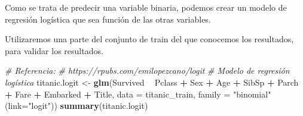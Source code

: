 \documentclass[]{article}
\newenvironment{Shaded}{\begin{snugshade}}{\end{snugshade}}
\newcommand{\KeywordTok}[1]{\textcolor[rgb]{0.13,0.29,0.53}{\textbf{#1}}}
\newcommand{\DataTypeTok}[1]{\textcolor[rgb]{0.13,0.29,0.53}{#1}}
\newcommand{\DecValTok}[1]{\textcolor[rgb]{0.00,0.00,0.81}{#1}}
\newcommand{\FloatTok}[1]{\textcolor[rgb]{0.00,0.00,0.81}{#1}}
\newcommand{\StringTok}[1]{\textcolor[rgb]{0.31,0.60,0.02}{#1}}
\newcommand{\CommentTok}[1]{\textcolor[rgb]{0.56,0.35,0.01}{\textit{#1}}}
\newcommand{\OtherTok}[1]{\textcolor[rgb]{0.56,0.35,0.01}{#1}}
\newcommand{\OperatorTok}[1]{\textcolor[rgb]{0.81,0.36,0.00}{\textbf{#1}}}
\newcommand{\NormalTok}[1]{#1}
\begin{document}
Como se trata de predecir una variable binaria, podemos crear un modelo
de regresión logística que sea función de las otras variables.

Utilizaremos una parte del conjunto de train del que conocemos los
resultados, para validar los resultados.

\begin{Shaded}
\end{Shaded}

\begin{Shaded}
\begin{Highlighting}[]
\CommentTok{# Referencia:}
\CommentTok{# https://rpubs.com/emilopezcano/logit}
\CommentTok{# Modelo de regresión logística}
\NormalTok{titanic.logit <-}\StringTok{ }\KeywordTok{glm}\NormalTok{(Survived }\OperatorTok{~}\StringTok{ }\NormalTok{Pclass }\OperatorTok{+}\StringTok{ }\NormalTok{Sex }\OperatorTok{+}\StringTok{ }\NormalTok{Age }\OperatorTok{+}\StringTok{ }\NormalTok{SibSp }\OperatorTok{+}\StringTok{ }\NormalTok{Parch }\OperatorTok{+}\StringTok{ }\NormalTok{Fare }\OperatorTok{+}\StringTok{ }\NormalTok{Embarked }\OperatorTok{+}\StringTok{ }\NormalTok{Title,}
                    \DataTypeTok{data =}\NormalTok{ titanic_train, }\DataTypeTok{family =} \StringTok{"binomial"}\NormalTok{(}\DataTypeTok{link=}\StringTok{"logit"}\NormalTok{))}
\KeywordTok{summary}\NormalTok{(titanic.logit)}
\end{Highlighting}
\end{Shaded}
\end{document}
